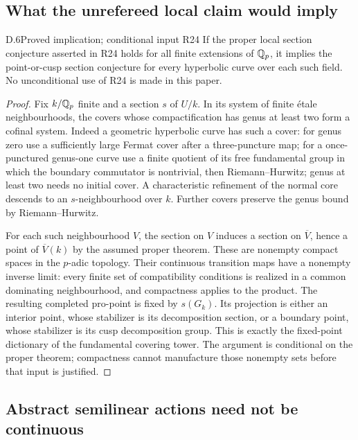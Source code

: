 \subsection{What the unrefereed local claim would imply}

\begin{claim}{D.6}{Proved implication; conditional input R24}
If the proper local section conjecture asserted in R24 holds for
all finite extensions of $\mathbb Q_p$, it implies the point-or-cusp
section conjecture for every hyperbolic curve over each such field.
No unconditional use of R24 is made in this paper.
\end{claim}
\begin{proof}
Fix $k/\mathbb Q_p$ finite and a section $s$ of $U/k$. In its system of
finite \'etale neighbourhoods, the covers whose compactification
has genus at least two form a cofinal system. Indeed a geometric
hyperbolic curve has such a cover: for genus zero use a sufficiently
large Fermat cover after a three-puncture map; for a once-punctured
genus-one curve use a finite quotient of its free fundamental group
in which the boundary commutator is nontrivial, then
Riemann--Hurwitz; genus at least two needs no initial cover.
A characteristic refinement of the normal core descends to an
$s$-neighbourhood over $k$. Further covers preserve the
genus bound by Riemann--Hurwitz.

For each such neighbourhood $V$, the section on $V$ induces a
section on $\overline V$, hence a point of $\overline V(k)$ by the
assumed proper theorem. These are nonempty compact spaces in the
$p$-adic topology. Their continuous transition maps have a
nonempty inverse limit: every finite set of compatibility
conditions is realized in a common dominating neighbourhood, and
compactness applies to the product. The resulting completed
pro-point is fixed by $s(G_k)$. Its projection is either an
interior point, whose stabilizer is its decomposition section,
or a boundary point, whose stabilizer is its cusp decomposition
group. This is exactly the fixed-point dictionary of the
fundamental covering tower. The argument is conditional on the
proper theorem; compactness cannot manufacture those nonempty
sets before that input is justified.
\end{proof}

\subsection{Abstract semilinear actions need not be continuous}

